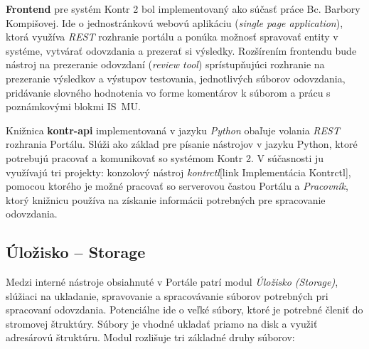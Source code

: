 \documentclass[
  digital, %
  twoside, %
  table,   %
  lof,     %
  lot,     %
]{fithesis3}
\begin{document}
\textbf{Frontend} pre systém Kontr 2 bol implementovaný ako súčasť práce Bc. Barbory Kompišovej\cite{kontr-portal}. Ide o jednostránkovú webovú aplikáciu (\emph{single page application}), ktorá využíva \emph{REST} rozhranie portálu a ponúka možnosť spravovať entity v systéme, vytvárať odovzdania a prezerať si výsledky. Rozšírením frontendu bude nástroj na prezeranie odovzdaní (\emph{review tool}) sprístupňujúci rozhranie na prezeranie výsledkov a výstupov testovania, jednotlivých súborov odovzdania, pridávanie slovného hodnotenia vo forme komentárov k súborom a prácu s poznámkovými blokmi IS~MU. 

Knižnica \textbf{kontr-api} implementovaná v jazyku \emph{Python} obaľuje volania \emph{REST} rozhrania Portálu. Slúži ako základ pre písanie nástrojov v jazyku Python, ktoré potrebujú pracovať a komunikovať so systémom Kontr 2. V súčasnosti ju využívajú tri projekty: konzolový nástroj \emph{kontrctl}[link Implementácia Kontrctl], pomocou ktorého je možné pracovať so serverovou častou Portálu a \emph{Pracovník}, ktorý knižnicu používa na získanie informácii potrebných pre spracovanie odovzdania.




\subsection{Úložisko -- Storage}

Medzi interné nástroje obsiahnuté v Portále patrí modul \emph{Úložisko (Storage)}, slúžiaci na ukladanie, spravovanie a spracovávanie súborov potrebných pri spracovaní odovzdania. Potenciálne ide o veľké súbory, ktoré je potrebné členiť do stromovej štruktúry. Súbory je vhodné ukladať priamo na disk a využiť adresárovú štruktúru. Modul rozlišuje tri základné druhy súborov: 
\end{document}
